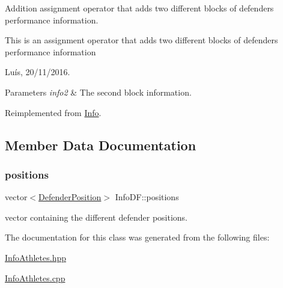 Addition assignment operator that adds two different blocks of defender\textquotesingle{}s performance information. 

This is an assignment operator that adds two different blocks of defender\textquotesingle{}s performance information

Luís, 20/11/2016. 


\begin{DoxyParams}{Parameters}
{\em info2} & The second block information. \\
\hline
\end{DoxyParams}


Reimplemented from \hyperlink{class_info_a35d820d35f8ab3b8de15cdfc07f0c5a4}{Info}.



\subsection{Member Data Documentation}
\hypertarget{class_info_d_f_ae694b60f6efc0190b16a99748b0eca40}{}\label{class_info_d_f_ae694b60f6efc0190b16a99748b0eca40} 
\subsubsection{\texorpdfstring{positions}{positions}}
{\footnotesize\ttfamily vector$<$\hyperlink{_utils_8hpp_a94ee089ecd5db12c81c7edbefaabff4d}{Defender\+Position}$>$ Info\+D\+F\+::positions\hspace{0.3cm}{\ttfamily [protected]}}



vector containing the different defender positions. 



The documentation for this class was generated from the following files\+:\begin{DoxyCompactItemize}
\item 
\hyperlink{_info_athletes_8hpp}{Info\+Athletes.\+hpp}\item 
\hyperlink{_info_athletes_8cpp}{Info\+Athletes.\+cpp}\end{DoxyCompactItemize}
